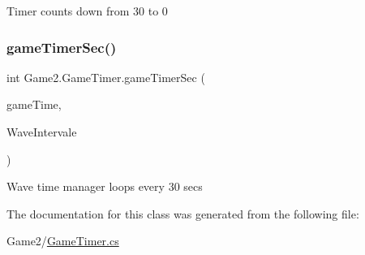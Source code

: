 Timer counts down from 30 to 0 \mbox{\label{class_game2_1_1_game_timer_ab343e6dcb30ffa2b96095b805be66b9f}} 
\subsubsection{\texorpdfstring{game\+Timer\+Sec()}{gameTimerSec()}}
{\footnotesize\ttfamily int Game2.\+Game\+Timer.\+game\+Timer\+Sec (\begin{DoxyParamCaption}\item[{Game\+Time}]{game\+Time,  }\item[{int}]{Wave\+Intervale }\end{DoxyParamCaption})}



Wave time manager loops every 30 secs 



The documentation for this class was generated from the following file\+:\begin{DoxyCompactItemize}
\item 
Game2/\mbox{\hyperlink{_game_timer_8cs}{Game\+Timer.\+cs}}\end{DoxyCompactItemize}
